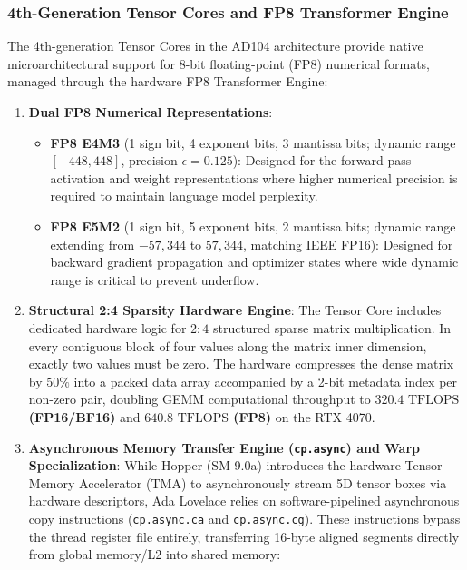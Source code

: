 \subsubsection{4th-Generation Tensor Cores and FP8 Transformer Engine}
\label{sec:appendix_ada_tensor_cores}

The 4th-generation Tensor Cores in the AD104 architecture provide native microarchitectural support for 8-bit floating-point (FP8) numerical formats, managed through the hardware FP8 Transformer Engine:
\begin{enumerate}
    \item \textbf{Dual FP8 Numerical Representations}:
    \begin{itemize}
        \item \textbf{FP8 E4M3} (1 sign bit, 4 exponent bits, 3 mantissa bits; dynamic range $[-448, 448]$, precision $\epsilon = 0.125$): Designed for the forward pass activation and weight representations where higher numerical precision is required to maintain language model perplexity.
        \item \textbf{FP8 E5M2} (1 sign bit, 5 exponent bits, 2 mantissa bits; dynamic range extending from $-57{,}344$ to $57{,}344$, matching IEEE FP16): Designed for backward gradient propagation and optimizer states where wide dynamic range is critical to prevent underflow.
    \end{itemize}
    \item \textbf{Structural 2:4 Sparsity Hardware Engine}: The Tensor Core includes dedicated hardware logic for $2:4$ structured sparse matrix multiplication. In every contiguous block of four values along the matrix inner dimension, exactly two values must be zero. The hardware compresses the dense matrix by $50\%$ into a packed data array accompanied by a 2-bit metadata index per non-zero pair, doubling GEMM computational throughput to \textbf{$320.4\text{ TFLOPS}$ (FP16/BF16)} and \textbf{$640.8\text{ TFLOPS}$ (FP8)} on the RTX 4070.
    \item \textbf{Asynchronous Memory Transfer Engine (\texttt{cp.async}) and Warp Specialization}: While Hopper (SM 9.0a) introduces the hardware Tensor Memory Accelerator (TMA) to asynchronously stream 5D tensor boxes via hardware descriptors, Ada Lovelace relies on software-pipelined asynchronous copy instructions (\texttt{cp.async.ca} and \texttt{cp.async.cg}). These instructions bypass the thread register file entirely, transferring 16-byte aligned segments directly from global memory/L2 into shared memory:
    \begin{lstlisting}[language=C++]

\end{lstlisting}
\end{enumerate}
